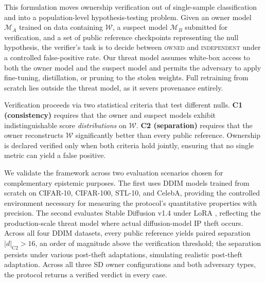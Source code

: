 \documentclass{article}
\begin{document}
This formulation moves ownership verification out of single-sample classification and into a population-level hypothesis-testing problem. Given an owner model $\mathcal{M}_A$ trained on data containing $\mathcal{W}$, a suspect model $\mathcal{M}_B$ submitted for verification, and a set of public reference checkpoints representing the null hypothesis, the verifier's task is to decide between \textsc{owned} and \textsc{independent} under a controlled false-positive rate. Our threat model assumes white-box access to both the owner model and the suspect model and permits the adversary to apply fine-tuning, distillation, or pruning to the stolen weights. Full retraining from scratch lies outside the threat model, as it severs provenance entirely.

Verification proceeds via two statistical criteria that test different nulls. \textbf{C1 (consistency)} requires that the owner and suspect models exhibit indistinguishable score \emph{distributions} on $\mathcal{W}$. \textbf{C2 (separation)} requires that the owner reconstructs $\mathcal{W}$ significantly better than every public reference. Ownership is declared verified only when both criteria hold jointly, ensuring that no single metric can yield a false positive.

We validate the framework across two evaluation scenarios chosen for complementary epistemic purposes. The first uses DDIM models trained from scratch on CIFAR-10, CIFAR-100, STL-10, and CelebA, providing the controlled environment necessary for measuring the protocol's quantitative properties with precision. The second evaluates Stable Diffusion v1.4 under LoRA , reflecting the production-scale threat model where actual diffusion-model IP theft occurs. Across all four DDIM datasets, every public reference yields paired separation $|d|_{\text{C2}} > 16$, an order of magnitude above the verification threshold; the separation persists under various post-theft adaptations, simulating realistic post-theft adaptation. Across all three SD owner configurations and both adversary types, the protocol returns a verified verdict in every case.
\end{document}
